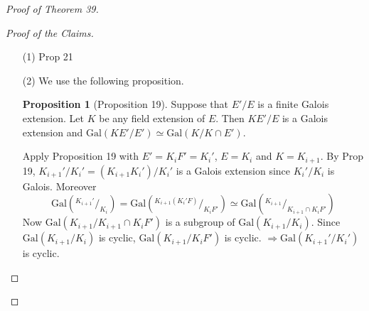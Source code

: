 \documentclass{article}
\theoremstyle{definition}
\newtheorem{prop}{Proposition}
\newenvironment{proofs}[1][\proofname]{%
  \begin{proof}[#1]$ $\par\nobreak\ignorespaces
}{%
  \end{proof}
}
\newcommand*\quot[2]{{^{\textstyle #1}\big/_{\textstyle #2}}}
\newcommand{\Ra}{\Rightarrow}
\newcommand{\Gal}{\text{Gal}}
\begin{document}
\begin{proofs}[Proof of Theorem 39]
	\begin{proofs}[Proof of the Claims]
		\begin{enumerate}
			\item[(1)] Prop 21

			\item[(2)] We use the following proposition.

				\begin{prop}[Proposition 19]
					Suppose that $E'/E$ is a finite Galois extension.
					Let $K$ be any field extension of $E$.
					Then $K E'/E$ is a Galois extension and $\Gal(K E'/E') \simeq \Gal(K/K \cap E')$.
				\end{prop}

				Apply Proposition 19 with $E' = K_i F' = K_i'$, $E = K_i$ and $K = K_{i + 1}$.
				By Prop 19, $K_{i + 1}'/K_i' = (K_{i + 1} K_i')/K_i'$ is a Galois extension since $K_i'/K_i$ is Galois.
				Moreover 
				\[
					\Gal \left( \quot{K_{i + 1}'}{K_{i}} \right) = \Gal \left( \quot{K_{i + 1} (K_i' F)}{K_i F'} \right) \simeq \Gal \left( \quot{K_{i + 1}}{K_{i + 1} \cap K_i F'} \right)
				\]
				Now $\Gal(K_{i + 1}/K_{i + 1} \cap K_i F')$ is a subgroup of $\Gal(K_{i + 1}/K_i)$.
				Since $\Gal(K_{i + 1}/K_i)$ is cyclic, $\Gal(K_{i + 1}/K_i F')$ is cyclic.
				$\Ra \Gal(K_{i + 1}'/K_i')$ is cyclic.
		\end{enumerate}
	\end{proofs}
\end{proofs}
\end{document}
